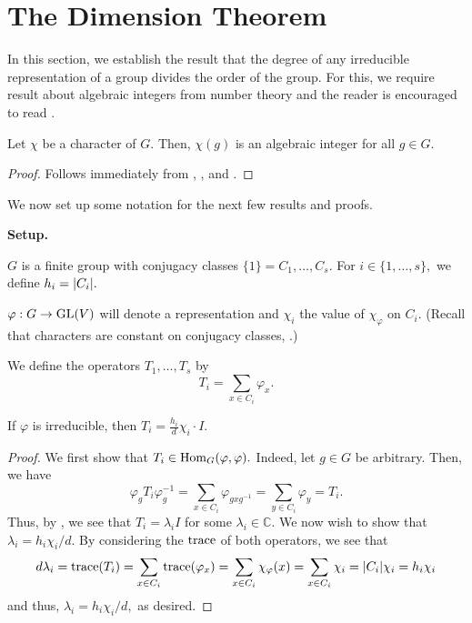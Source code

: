 \section{The Dimension Theorem}
In this section, we establish the result that the degree of any irreducible representation of a group divides the order of the group. For this, we require result about algebraic integers from number theory and the reader is encouraged to read .

\begin{prop} \label{prop:charisalgint}
	Let $\chi$ be a character of $G.$ Then, $\chi(g)$ is an algebraic integer for all $g \in G.$
\end{prop}
\begin{proof} 
	Follows immediately from , , and .
\end{proof}

We now set up some notation for the next few results and proofs.

\begin{aside}
	\textbf{Setup.}

	$G$ is a finite group with conjugacy classes $\{1\} = C_1, \ldots, C_s.$ For $i \in \{1, \ldots, s\},$ we define $h_i = {\left\lvert C_i \right\lvert}.$

	$\varphi : G \to \operatorname{GL}(V)$ will denote a representation and $\chi_i$ the value of $\chi_\varphi$ on $C_i.$ (Recall that characters are constant on conjugacy classes, .)

	We define the operators $T_1, \ldots, T_s$ by
	\begin{equation*} 
		T_i = \sum_{x \in C_i} \varphi_x.
	\end{equation*}
\end{aside}

\begin{lem}
	If $\varphi$ is irreducible, then $T_i = \frac{h_i}{d}\chi_i \cdot I.$
\end{lem}
\begin{proof} 
	We first show that $T_i \in \operatorname{Hom}_{G}(\varphi, \varphi).$ Indeed, let $g \in G$ be arbitrary. Then, we have
	\begin{equation*} 
		\varphi_gT_i\varphi_g^{-1} = \sum_{x \in C_i} \varphi_{gxg^{-1}} = \sum_{y \in C_i} \varphi_y = T_i.
	\end{equation*}
	Thus, by , we see that $T_i = \lambda_iI$ for some $\lambda_i \in \mathbb{C}.$ We now wish to show that $\lambda_i = h_i\chi_i/d.$ By considering the $\operatorname{trace}$ of both operators, we see that
	\begin{equation*} 
		d\lambda_i = \operatorname{trace}(T_i) = \sum_{x \in C_i} \operatorname{trace}(\varphi_x) = \sum_{x \in C_i} \chi_\varphi(x) = \sum_{x \in C_i} \chi_i = {\left\lvert C_i \right\lvert}\chi_i = h_i\chi_i
	\end{equation*}
	and thus, $\lambda_i = h_i\chi_i/d,$ as desired.
\end{proof}

